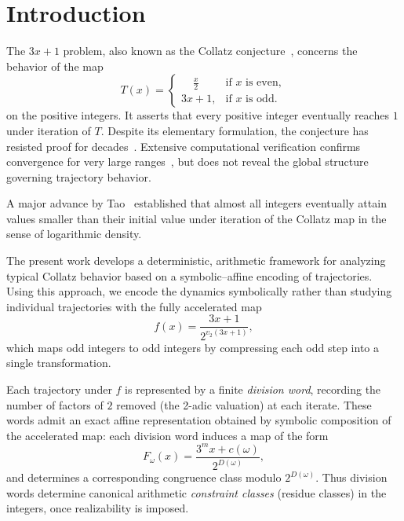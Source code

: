 \documentclass[12pt, oneside]{article}
\numberwithin{equation}{section}
\theoremstyle{definition}
\theoremstyle{plain}
\theoremstyle{remark}
\begin{document}
\newpage
\tableofcontents

\newpage
\section{Introduction}

The $3x+1$ problem, also known as the Collatz conjecture~\cite{Collatz1937}, concerns
the behavior of the map
\[
T(x) =
\begin{cases}
\displaystyle
    \phantom{3x} \frac{x}{2} & \text {if } x \text{ is even}, \\[8pt]
\displaystyle
    3x+1,                    & \text{if $x$ is odd}.
\end{cases}
\]
on the positive integers. It asserts that every positive integer eventually reaches $1$
under iteration of $T$. Despite its elementary formulation, the conjecture has resisted
proof for decades~\cite{Lagarias2010,Terras1976}. Extensive computational verification
confirms convergence for very large ranges~\cite{OliveiraESilva2010}, but does not
reveal the global structure governing trajectory behavior.

A major advance by Tao~\cite{Tao2019} established that almost all integers
eventually attain values smaller than their initial value under iteration
of the Collatz map in the sense of logarithmic density.

The present work develops a deterministic, arithmetic framework for analyzing typical
Collatz behavior based on a symbolic–affine encoding of trajectories. Using this approach,
we encode the dynamics symbolically rather than studying individual trajectories with
the fully accelerated map
\[
f(x)=\frac{3x+1}{2^{v_2(3x+1)}},
\]
which maps odd integers to odd integers by compressing each odd step into a single
transformation.

Each trajectory under $f$ is represented by a finite \emph{division word}, recording the
number of factors of $2$ removed (the 2-adic valuation) at each iterate. These words admit
an exact affine representation obtained by symbolic composition of the accelerated map:
each division word induces a map of the form
\[
F_\omega(x) = \frac{3^m x + c(\omega)}{2^{D(\omega)}},
\]
and determines a corresponding congruence class modulo $2^{D(\omega)}$. Thus division words
determine canonical arithmetic \emph{constraint classes} (residue classes) in the integers,
once realizability is imposed.
\end{document}
